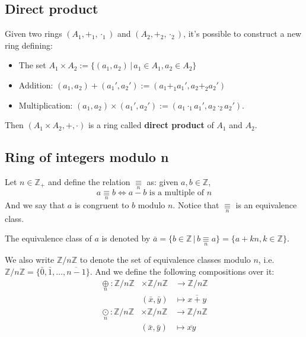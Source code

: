 \documentclass[12pt,a4paper]{article}
\begin{document}
\subsection{Direct product}\label{direct-product}

Given two rings \((A_1, +_1, \cdot_1)\) and \((A_2, +_2, \cdot_2)\), it's possible to construct a new ring defining:

\begin{itemize}
\item
  The set
  \(A_1 \times A_2 := \{ (a_1, a_2) \, | \, a_1 \in A_1, a_2 \in A_2 \}\)
\item
  Addition:
  \((a_1, a_2) + (a_1', a_2') := (a_1 +_1 a_1', a_2 +_2 a_2')\)
\item
  Multiplication:
  \((a_1, a_2) \times (a_1', a_2') := (a_1 \cdot_1 a_1', a_2 \cdot_2 a_2')\).
\end{itemize}

Then \((A_1 \times A_2, +, \cdot)\) is a ring called \textbf{direct product} of \(A_1\) and \(A_2\).

\subsection{Ring of integers modulo n}

Let \(n \in \mathbb{Z}_+\) and define the relation \(\underset{n}{\equiv}\) as: given $a,b \in \mathbb{Z}$,
\[ a \underset{n}{\equiv} b \iff a - b \text{ is a multiple of } n \]
And we say that $a$ is congruent to $b$ modulo $n$. Notice that \(\underset{n}{\equiv}\) is an equivalence class.

The equivalence class of $a$ is denoted by \(\bar{a} = \{ b \in \mathbb{Z} \, | \, b \underset{n}{\equiv} a \} = \{ a+kn, k \in \mathbb{Z} \}\).

We also write \(\mathbb{Z}/n \mathbb{Z}\) to denote the set of equivalence classes modulo \(n\), i.e. \(\mathbb{Z}/n \mathbb{Z} = \{ \bar{0}, \bar{1}, \ldots, \overline{n-1} \}\). And we define the following compositions over it:
\begin{equation*}
\begin{aligned}
\underset{n}{\oplus}:  \mathbb{Z}/n \mathbb{Z} & \times \mathbb{Z}/n \mathbb{Z} &\to \mathbb{Z}/n \mathbb{Z}\\
&(\bar{x}, \bar{y}) &\mapsto \overline{x+y}
\end{aligned}
\end{equation*}
\begin{equation*}
\begin{aligned}
\underset{n}{\odot}: \mathbb{Z}/n \mathbb{Z} & \times \mathbb{Z}/n \mathbb{Z} &\to \mathbb{Z}/n \mathbb{Z}\\
&(\bar{x}, \bar{y}) &\mapsto \overline{xy}
\end{aligned}
\end{equation*}
\end{document}

